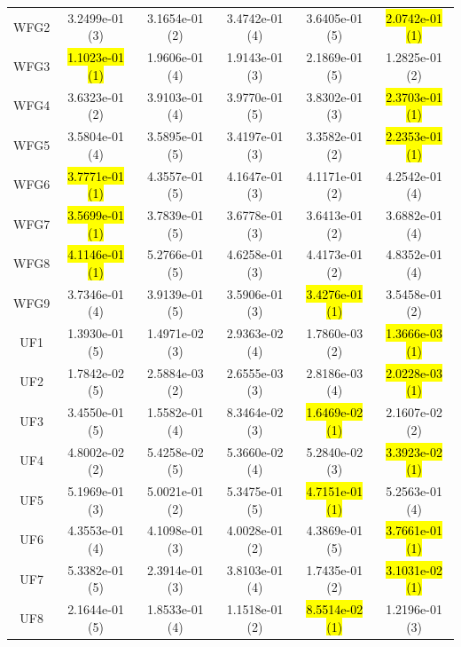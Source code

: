 \documentclass[journal]{IEEEtran}
\begin{document}
\begin{table}[tbp]
\begin{tabular}{cccccc}
    WFG2            & 3.2499e-01 (3)      & 3.1654e-01 (2)      & 3.4742e-01 (4)    & 3.6405e-01 (5)      & \hl{2.0742e-01 (1)} \\
    WFG3            & \hl{1.1023e-01 (1)} & 1.9606e-01 (4)      & 1.9143e-01 (3)    & 2.1869e-01 (5)      & 1.2825e-01 (2)      \\
    WFG4            & 3.6323e-01 (2)      & 3.9103e-01 (4)      & 3.9770e-01 (5)    & 3.8302e-01 (3)      & \hl{2.3703e-01 (1)} \\
    WFG5            & 3.5804e-01 (4)      & 3.5895e-01 (5)      & 3.4197e-01 (3)    & 3.3582e-01 (2)      & \hl{2.2353e-01 (1)} \\
    WFG6            & \hl{3.7771e-01 (1)} & 4.3557e-01 (5)      & 4.1647e-01 (3)    & 4.1171e-01 (2)      & 4.2542e-01 (4)      \\
    WFG7            & \hl{3.5699e-01 (1)} & 3.7839e-01 (5)      & 3.6778e-01 (3)    & 3.6413e-01 (2)      & 3.6882e-01 (4)      \\
    WFG8            & \hl{4.1146e-01 (1)} & 5.2766e-01 (5)      & 4.6258e-01 (3)    & 4.4173e-01 (2)      & 4.8352e-01 (4)      \\
    WFG9            & 3.7346e-01 (4)      & 3.9139e-01 (5)      & 3.5906e-01 (3)    & \hl{3.4276e-01 (1)} & 3.5458e-01 (2)      \\
    \hline
    UF1             & 1.3930e-01 (5)      & 1.4971e-02 (3)      & 2.9363e-02 (4)    & 1.7860e-03 (2)      & \hl{1.3666e-03 (1)} \\
    UF2             & 1.7842e-02 (5)      & 2.5884e-03 (2)      & 2.6555e-03 (3)    & 2.8186e-03 (4)      & \hl{2.0228e-03 (1)} \\
    UF3             & 3.4550e-01 (5)      & 1.5582e-01 (4)      & 8.3464e-02 (3)    & \hl{1.6469e-02 (1)} & 2.1607e-02 (2)      \\
    UF4             & 4.8002e-02 (2)      & 5.4258e-02 (5)      & 5.3660e-02 (4)    & 5.2840e-02 (3)      & \hl{3.3923e-02 (1)} \\
    UF5             & 5.1969e-01 (3)      & 5.0021e-01 (2)      & 5.3475e-01 (5)    & \hl{4.7151e-01 (1)} & 5.2563e-01 (4)      \\
    UF6             & 4.3553e-01 (4)      & 4.1098e-01 (3)      & 4.0028e-01 (2)    & 4.3869e-01 (5)      & \hl{3.7661e-01 (1)} \\
    UF7             & 5.3382e-01 (5)      & 2.3914e-01 (3)      & 3.8103e-01 (4)    & 1.7435e-01 (2)      & \hl{3.1031e-02 (1)} \\
    UF8             & 2.1644e-01 (5)      & 1.8533e-01 (4)      & 1.1518e-01 (2)    & \hl{8.5514e-02 (1)} & 1.2196e-01 (3)      \\

\end{tabular}
\end{table}
\end{document}
